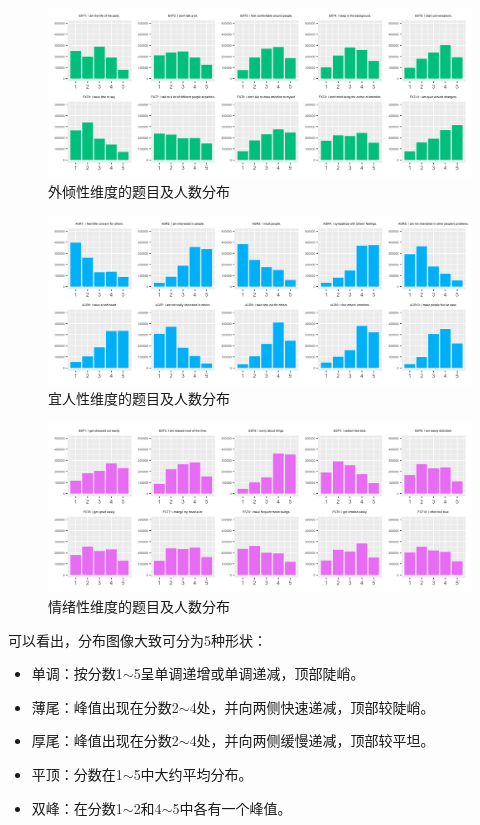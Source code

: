 \documentclass[UTF8]{ctexart}
\begin{document}
\begin{figure}[H]
  \centering
  \includegraphics[scale=0.478]{EXT.png}
  \caption{外倾性维度的题目及人数分布}
\end{figure}
\begin{figure}[H]
  \centering
  \includegraphics[scale=0.478]{AGR.png}
  \caption{宜人性维度的题目及人数分布}
\end{figure}
\begin{figure}[H]
  \centering
  \includegraphics[scale=0.478]{EST.png}
  \caption{情绪性维度的题目及人数分布}
\end{figure}
可以看出，分布图像大致可分为5种形状：
\begin{itemize}
  \item 单调：按分数1$\sim$5呈单调递增或单调递减，顶部陡峭。
  \item 薄尾：峰值出现在分数2$\sim$4处，并向两侧快速递减，顶部较陡峭。
  \item 厚尾：峰值出现在分数2$\sim$4处，并向两侧缓慢递减，顶部较平坦。
  \item 平顶：分数在1$\sim$5中大约平均分布。
  \item 双峰：在分数1$\sim$2和4$\sim$5中各有一个峰值。
\end{itemize}\par
\end{document}
